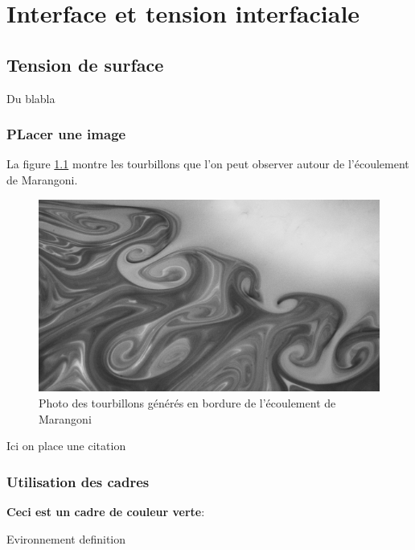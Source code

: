 \part{Interface et tension interfaciale}

\chapter{Tension de surface}

Du blabla

\section{PLacer une image}

La figure \ref{fig:TourbillonsDeMarangoni} montre les tourbillons que l'on peut observer autour de l'écoulement de Marangoni.

\begin{figure}[!ht]
  \centering
  \includegraphics*[scale = .8]{./figures/chap1/Tourbillons_Marangoni.png}
  \caption{Photo des tourbillons générés en bordure de l'écoulement de Marangoni}
  \label{fig:TourbillonsDeMarangoni}
\end{figure}

Ici on place une citation \cite{le2021surface}

\clearpage
\section{Utilisation des cadres}


\begin{ombredef}
  \begin{definition}
    \textbf{Ceci est un cadre de couleur verte}:\bigskip

    Evironnement definition
  \end{definition}
\end{ombredef}


